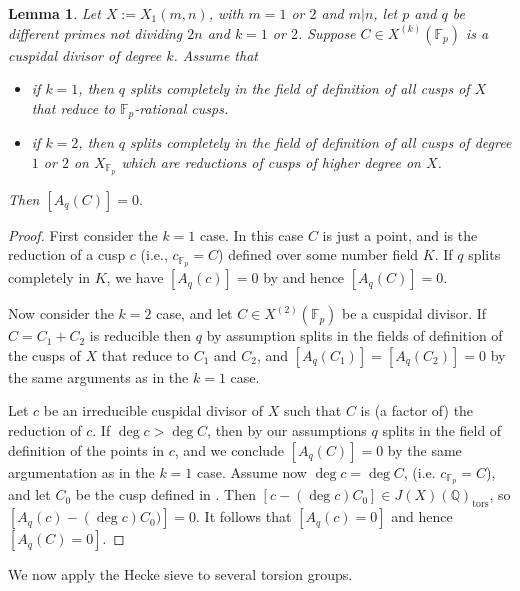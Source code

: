 \documentclass[11pt,reqno]{amsart}
\newtheorem{lemma}[theorem]{Lemma}
\theoremstyle{definition}
\numberwithin{equation}{section}
\newcommand{\Q}{\mathbb{Q}}
\newcommand{\F}{\mathbb{F}}
\newcommand{\tor}{\mathrm{tors}}
\begin{document}
\begin{lemma}\label{lem:CC} Let $X:=X_1(m,n)$, with $m=1$ or $2$ and $m|n$, let $p$ and $q$ be different primes not dividing $2n$ and $k=1$ or $2$. Suppose $C\in X^{(k)}(\F_p)$ is a cuspidal divisor of degree $k$. Assume that 
\begin{itemize}
    \item[a)] if $k=1$, then $q$ splits completely in the field of definition of all cusps of $X$ that reduce to $\F_p$-rational cusps. 
    \item[b)] if $k=2$, then $q$ splits completely in the field of definition of all cusps of degree $1$ or $2$ on $X_{\F_p}$ which are reductions of cusps of higher degree on $X$.
\end{itemize}
    Then $[A_q(C)]=0.$
\end{lemma}
\begin{proof}
First consider the $k=1$ case. In this case $C$ is just a point, and is the reduction of a cusp $c$ (i.e., $c_{\F_p}=C$) defined over some number field $K$. If $q$ splits completely in $K$, we have $[A_q(c)]=0$ by  and hence $[A_q(C)]=0$. 

Now consider the $k=2$ case, and let $C\in X^{(2)}(\F_p)$ be a cuspidal divisor. If $C=C_1+C_2$ is reducible then $q$ by assumption splits in the fields of definition of the cusps of $X$ that reduce to $C_1$ and $C_2$, and $[A_q(C_1)]=[A_q(C_2)]=0$ by the same arguments as in the $k=1$ case. 

Let $c$ be an irreducible cuspidal divisor of $X$ such that $C$ is (a factor of) the reduction of $c$. If $\deg c>\deg C$, then by our assumptions $q$ splits in the field of definition of the points in $c$, and we conclude $[A_q(C)]=0$ by the same argumentation as in the $k=1$ case. Assume now $\deg c=\deg C$, (i.e. $c_{\F_p}=C$), and let $C_0$ be the cusp defined in . Then $[c-(\deg c) C_0]\in J(X)(\Q)_\tor$, so $[A_q(c)-(\deg c) C_0)]=0$. It follows that $[A_q(c)=0]$ and hence $[A_q(C)=0]$.
   
\end{proof}


We now apply the Hecke sieve to several torsion groups.
\end{document}
